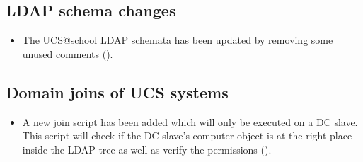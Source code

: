 \subsection{LDAP schema changes}
\begin{itemize}
\item The UCS@school LDAP schemata has been updated by removing some unused comments ().
\end{itemize}


\subsection{Domain joins of UCS systems}
\begin{itemize}
\item A new join script has been added which will only be executed on a DC
  slave. This script will check if the DC slave's computer object is at the
  right place inside the LDAP tree as well as verify the permissions
  ().
\end{itemize}

